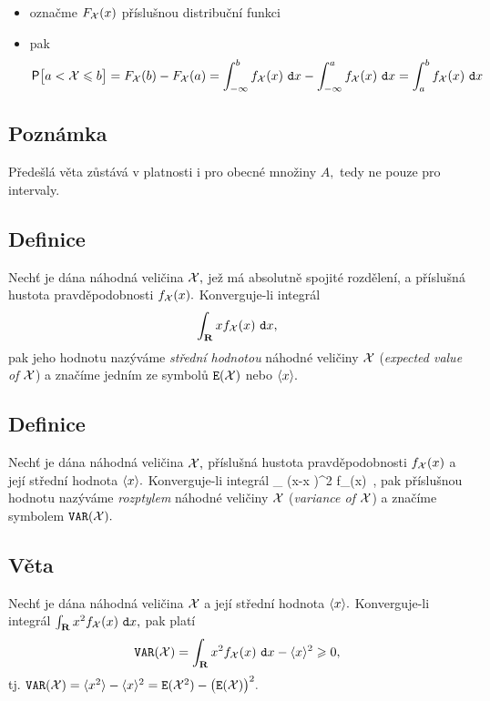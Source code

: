 \Proof

\begin{itemize}
\item ozna\v cme $F_{\mathcal X}(x)$ p\v r\'islu\v snou distribu\v cn\'i funkci
\item pak $$\mbox{\sf P}\bigl[a < {\mathcal X}  \leqslant b\bigr]=F_{\mathcal X}(b)-F_{\mathcal X}(a)=\int_{-\infty}^b f_{\mathcal X}(x)~\mathtt{d}x - \int_{-\infty}^a f_{\mathcal X}(x)~\mathtt{d}x=  \int_a^b f_{\mathcal X}(x)~\mathtt{d}x$$
\end{itemize}

\subsection{Poznámka}

P\v rede\v sl\'a v\v eta z\r ust\'av\'a v platnosti i pro obecn\'e mno\v ziny $A,$ tedy ne pouze pro intervaly.


\subsection{Definice}
Nech\v t je d\'ana n\'ahodn\'a veli\v cina ${\mathcal X},$ je\v z m\'a absolutn\v e spojit\'e rozd\v elen\'i, a p\v r\'islu\v
sn\'a hustota pravd\v epodobnosti $f_{\mathcal X}(x).$ Konverguje-li integr\'al
$$\int_{{\mathbf R}} x f_{\mathcal X}(x)~\mathtt{d}x,$$ pak jeho hodnotu
naz\'yv\'ame \emph{střední hodnotou} n\'ahodn\'e veli\v ciny ${\mathcal X}$
(\emph{expected value of ${\mathcal X}$}) a zna\v c\'ime jedn\'im ze symbol\r u $\mathtt{E}({\mathcal X})$ nebo $\langle x \rangle.$

\subsection{Definice}
Nech\v t je d\'ana n\'ahodn\'a veli\v cina ${\mathcal X},$ p\v r\'islu\v sn\'a hustota pravd\v epodobnosti $f_{\mathcal X}(x)$ a jej\'i st\v redn\'i hodnota  $\langle x \rangle.$ Konverguje-li integr\'al
%
\BE \int_{\R} \bigr(x-\la x \ra\bigr)^2 f_\X(x)~\dx,\label{Bonjour-Filou}\EE
%
pak p\v r\'islu\v snou hodnotu naz\'yv\'ame \emph{rozptylem} n\'ahodn\'e veli\v ciny ${\mathcal X}$ (\emph{variance of ${\mathcal X}$}) a zna\v c\'ime symbolem $\mathtt{VAR}({\mathcal X}).$

\subsection{V\v eta} \label{vypoctova-veta-pro-rozptyl}
Nech\v t je d\'ana n\'ahodn\'a veli\v cina ${\mathcal X}$ a jej\'i st\v redn\'i hodnota  $\langle x \rangle.$ Konverguje-li integr\'al $\int_{{\mathbf R}} x^2 f_{\mathcal X}(x)~\mathtt{d}x,$ pak plat\'i
%
$$\mathtt{VAR}({\mathcal X})=\int_{{\mathbf R}} x^2 f_{\mathcal X}(x)~\mathtt{d}x-\langle x \rangle^2 \geqslant 0,$$
%
tj. $\mathtt{VAR}({\mathcal X})= \langle x^2 \rangle - \langle x \rangle^2 = \mathtt{E}({\mathcal X}^2)-\bigl(\mathtt{E}({\mathcal X})\bigr)^2.$\\


